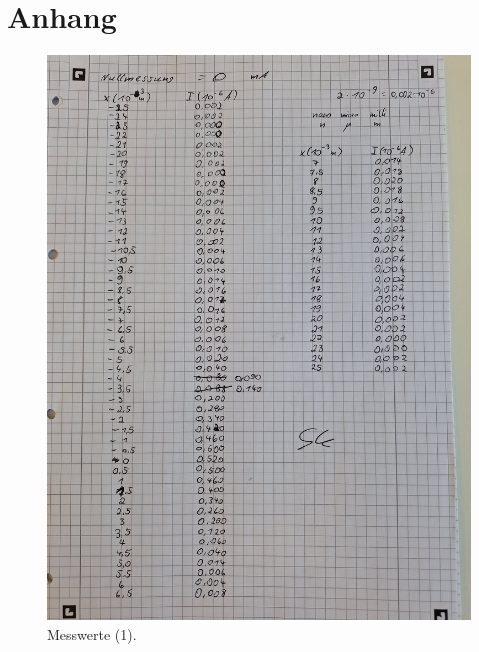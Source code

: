 \section{Anhang}
\label{sec:Anhang}

\begin{figure}
    \caption{Messwerte (1).}
    \centering
    \includegraphics[width=\textwidth, angle=-90]{"Bilder/mw1.jpg"}
\end{figure}
